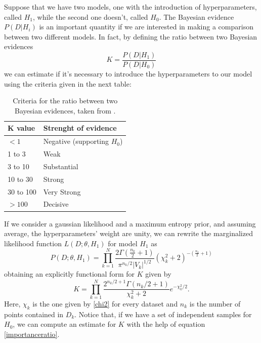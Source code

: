 \documentclass[onecolumn,           %
               showpacs,            %
               preprintnumbers,     %
               aps,                 %
               prl,          	    %
               letterpaper,             %
               superscriptaddress,      %
               nofootinbib,         %
               tightenlines,        %
               floats,floatfix      %
               ,usenatbib,
               ]{revtex4-1}
\begin{document}
Suppose that we have two models, one with the introduction of hyperparameters, called $H_1$, while the second one doesn't, called $H_0$. The Bayesian evidence $P(D|H_i)$ is an important quantity if we are interested in making a comparison between two different models. In fact, by defining the ratio between two Bayesian evidences
\begin{equation}
K=\frac{P(D|H_1)}{P(D|H_0)}
\end{equation}
we can estimate if it's necessary to introduce the hyperparameters to our model using the criteria given in the next table:
\begin{table}[h!]
\centering
\begin{tabular}{||l|l||} 
 \hline
 \textbf{K value} & \textbf{Strenght of evidence} \\ [0.5ex] 
 \hline\hline
 $<1$  & Negative (supporting $H_0$)   \\ 
 \hline
 1 to 3 & Weak \\
 \hline 
3 to 10 & Substantial\\
\hline
10 to 30 & Strong\\
\hline
30 to 100 & Very Strong \\
\hline
$>100$ & Decisive\\ [1ex] 
 \hline
\end{tabular}\label{evidence}
\caption{Criteria for the ratio between two Bayesian evidences, taken from \cite{hiperp2}.}
\end{table}

If we consider a gaussian likelihood and a maximum entropy prior, and assuming average, the hyperparameters' weight are unity, we can rewrite the marginalized likelihood function $L(D;\theta,H_1)$ for model $H_1$ as
\begin{equation}
P(D;\theta,H_1)=\prod_{k=1}^N\frac{2\Gamma(\frac{n_k}{2}+1)}{\pi^{n_k/2}|V_k|^{1/2}}(\chi_k^2+2)^{-\left(\frac{n_k}{2}+1\right)}
\end{equation}
obtaining an explicitly functional form for $K$ given by
\begin{equation}
K=\prod_{k=1}^N\frac{2^{n_k/2+1}\Gamma(n_k/2+1)}{\chi^2_k+2}e^{-\chi_k^2/2}.
\end{equation}
Here, $\chi_k$ is the one given by \ref{chi2} for every dataset and $n_k$ is the number of points contained in $D_k$. Notice that, if we have a set of independent samples for $H_0$, we can compute an estimate for $K$ with the help of equation \eqref{importanceratio}. 
\end{document}
